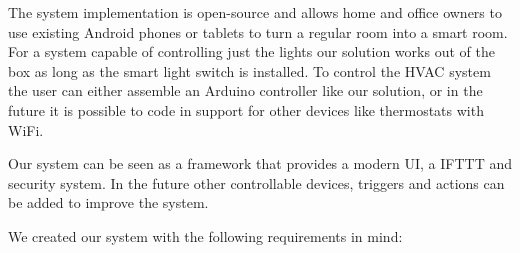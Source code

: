 The system implementation is open-source and allows home and office owners to use existing Android phones or tablets to turn a regular room into a smart room. For a system capable of controlling just the lights our solution works out of the box as long as the smart light switch is installed. To control the \ac{HVAC} system the user can either assemble an Arduino controller like our solution, or in the future it is possible to code in support for other devices like thermostats with \ac{WiFi}. 

Our system can be seen as a framework that provides a modern \ac{UI}, a \ac{IFTTT} and security system. In the future other controllable devices, triggers and actions can be added to improve the system.



We created our system with the following requirements in mind:

